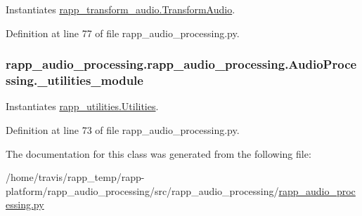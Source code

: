 Instantiates \hyperlink{classrapp__audio__processing_1_1rapp__transform__audio_1_1TransformAudio}{rapp\-\_\-transform\-\_\-audio.\-Transform\-Audio}. 



Definition at line 77 of file rapp\-\_\-audio\-\_\-processing.\-py.

\hypertarget{classrapp__audio__processing_1_1rapp__audio__processing_1_1AudioProcessing_afedf690b9ec2f330bcda9b50ebc92714}{
\subsubsection[{\-\_\-utilities\-\_\-module}]{\setlength{\rightskip}{0pt plus 5cm}rapp\-\_\-audio\-\_\-processing.\-rapp\-\_\-audio\-\_\-processing.\-Audio\-Processing.\-\_\-utilities\-\_\-module\hspace{0.3cm}{\ttfamily [private]}}}\label{classrapp__audio__processing_1_1rapp__audio__processing_1_1AudioProcessing_afedf690b9ec2f330bcda9b50ebc92714}


Instantiates \hyperlink{classrapp__audio__processing_1_1rapp__utilities_1_1Utilities}{rapp\-\_\-utilities.\-Utilities}. 



Definition at line 73 of file rapp\-\_\-audio\-\_\-processing.\-py.



The documentation for this class was generated from the following file\-:\begin{DoxyCompactItemize}
\item 
/home/travis/rapp\-\_\-temp/rapp-\/platform/rapp\-\_\-audio\-\_\-processing/src/rapp\-\_\-audio\-\_\-processing/\hyperlink{rapp__audio__processing_8py}{rapp\-\_\-audio\-\_\-processing.\-py}\end{DoxyCompactItemize}
